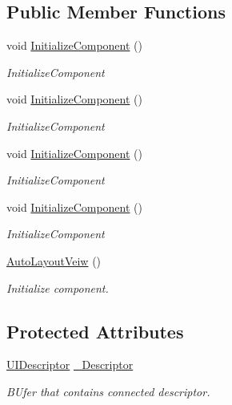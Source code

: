 \subsection*{Public Member Functions}
\begin{DoxyCompactItemize}
\item 
void \mbox{\hyperlink{class_wpf_handler_1_1_u_i_1_1_auto_layout_1_1_controls_1_1_auto_layout_veiw_a9f1091c6f4daf3c752f2787d8ae1a4b6}{Initialize\+Component}} ()
\begin{DoxyCompactList}\small\item\em Initialize\+Component \end{DoxyCompactList}\item 
void \mbox{\hyperlink{class_wpf_handler_1_1_u_i_1_1_auto_layout_1_1_controls_1_1_auto_layout_veiw_a9f1091c6f4daf3c752f2787d8ae1a4b6}{Initialize\+Component}} ()
\begin{DoxyCompactList}\small\item\em Initialize\+Component \end{DoxyCompactList}\item 
void \mbox{\hyperlink{class_wpf_handler_1_1_u_i_1_1_auto_layout_1_1_controls_1_1_auto_layout_veiw_a9f1091c6f4daf3c752f2787d8ae1a4b6}{Initialize\+Component}} ()
\begin{DoxyCompactList}\small\item\em Initialize\+Component \end{DoxyCompactList}\item 
void \mbox{\hyperlink{class_wpf_handler_1_1_u_i_1_1_auto_layout_1_1_controls_1_1_auto_layout_veiw_a9f1091c6f4daf3c752f2787d8ae1a4b6}{Initialize\+Component}} ()
\begin{DoxyCompactList}\small\item\em Initialize\+Component \end{DoxyCompactList}\item 
\mbox{\hyperlink{class_wpf_handler_1_1_u_i_1_1_auto_layout_1_1_controls_1_1_auto_layout_veiw_a1bfcdfad104151ab6060168e0cbd0623}{Auto\+Layout\+Veiw}} ()
\begin{DoxyCompactList}\small\item\em Initialize component. \end{DoxyCompactList}\end{DoxyCompactItemize}
\subsection*{Protected Attributes}
\begin{DoxyCompactItemize}
\item 
\mbox{\hyperlink{class_wpf_handler_1_1_u_i_1_1_auto_layout_1_1_u_i_descriptor}{U\+I\+Descriptor}} \mbox{\hyperlink{class_wpf_handler_1_1_u_i_1_1_auto_layout_1_1_controls_1_1_auto_layout_veiw_abbafb7ec000393dc0cbffd3c1f1a8239}{\+\_\+\+Descriptor}}
\begin{DoxyCompactList}\small\item\em B\+Ufer that contains connected descriptor. \end{DoxyCompactList}\end{DoxyCompactItemize}
